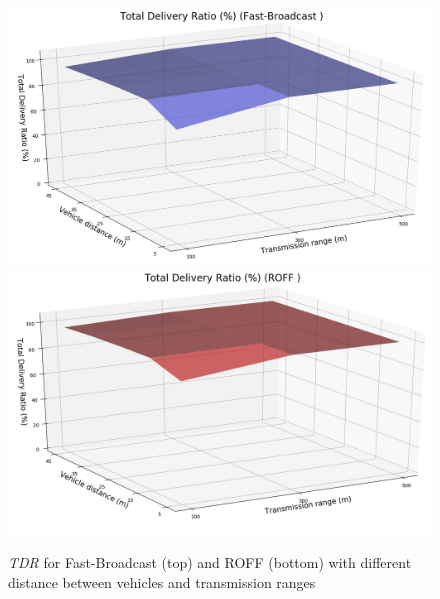 		\begin{figure}[H]
			\centering
			\includegraphics[width=1.0\textwidth]{immagini/density/fb/tdr}
			\includegraphics[width=1.0\textwidth]{immagini/density/roff/tdr}
			\caption{\textit{TDR} for Fast-Broadcast (top) and ROFF (bottom) with different distance between vehicles and transmission ranges}
			\label{fig:density-tdr}
		\end{figure}
	
